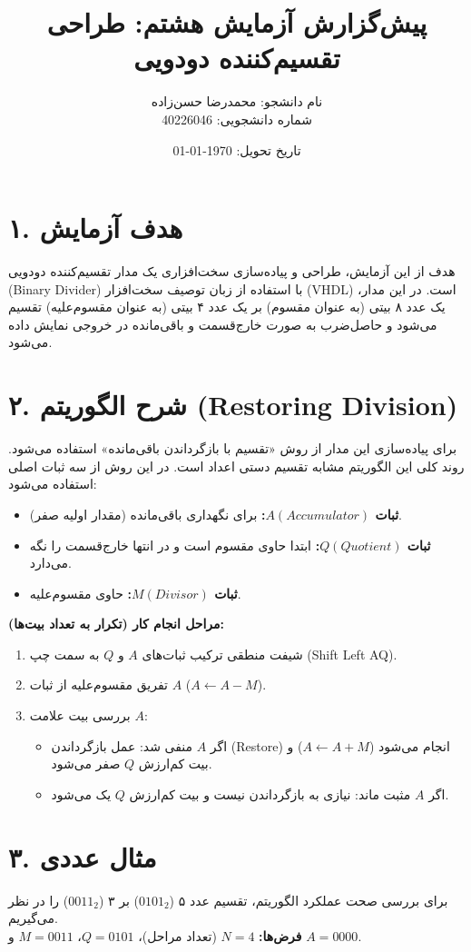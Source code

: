 \documentclass[12pt, a4paper]{article}
\title{\vspace{-2cm} \textbf{پیش‌گزارش آزمایش هشتم: طراحی تقسیم‌کننده دودویی}}
\author{نام دانشجو: محمدرضا حسن‌زاده  \\ شماره دانشجویی: 40226046}
\date{تاریخ تحویل: \today}
\begin{document}
\maketitle

\section*{۱. هدف آزمایش}
هدف از این آزمایش، طراحی و پیاده‌سازی سخت‌افزاری یک مدار تقسیم‌کننده دودویی (Binary Divider) با استفاده از زبان توصیف سخت‌افزار (VHDL) است. در این مدار، یک عدد ۸ بیتی (به عنوان مقسوم) بر یک عدد ۴ بیتی (به عنوان مقسوم‌علیه) تقسیم می‌شود و حاصل‌ضرب به صورت خارج‌قسمت و باقی‌مانده در خروجی نمایش داده می‌شود.

\section*{۲. شرح الگوریتم (Restoring Division)}
برای پیاده‌سازی این مدار از روش «تقسیم با بازگرداندن باقی‌مانده» استفاده می‌شود. روند کلی این الگوریتم مشابه تقسیم دستی اعداد است. 
در این روش از سه ثبات اصلی استفاده می‌شود:
\begin{itemize}
    \item \textbf{ثبات $A (Accumulator)$:} برای نگهداری باقی‌مانده (مقدار اولیه صفر).
    \item \textbf{ثبات $Q (Quotient)$:} ابتدا حاوی مقسوم است و در انتها خارج‌قسمت را نگه می‌دارد.
    \item \textbf{ثبات $M (Divisor)$:} حاوی مقسوم‌علیه.
\end{itemize}

\textbf{مراحل انجام کار (تکرار به تعداد بیت‌ها):}
\begin{enumerate}
    \item شیفت منطقی ترکیب ثبات‌های $A$ و $Q$ به سمت چپ (Shift Left AQ).
    \item تفریق مقسوم‌علیه از ثبات $A$ ($A \leftarrow A - M$).
    \item بررسی بیت علامت $A$:
    \begin{itemize}
        \item اگر $A$ منفی شد: عمل بازگرداندن (Restore) انجام می‌شود ($A \leftarrow A + M$) و بیت کم‌ارزش $Q$ صفر می‌شود.
        \item اگر $A$ مثبت ماند: نیازی به بازگرداندن نیست و بیت کم‌ارزش $Q$ یک می‌شود.
    \end{itemize}
\end{enumerate}

\section*{۳. مثال عددی}
برای بررسی صحت عملکرد الگوریتم، تقسیم عدد ۵ ($0101_2$) بر ۳ ($0011_2$) را در نظر می‌گیریم. \\
\textbf{فرض‌ها:} $N=4$ (تعداد مراحل)، $Q=0101$، $M=0011$ و $A=0000$.
\end{document}
